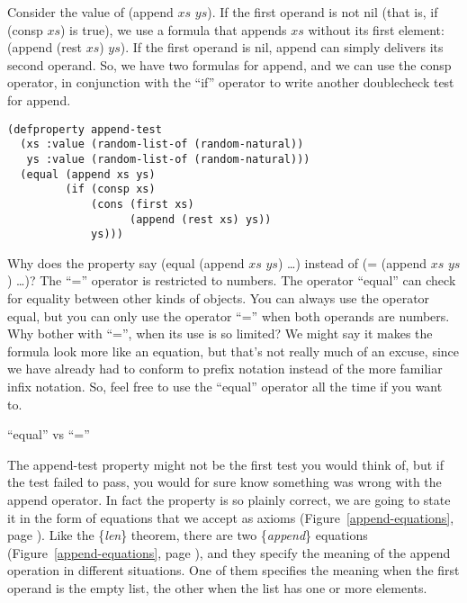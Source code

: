 Consider the value of (append $xs$ $ys$).
If the first operand is not nil (that is, if (consp $xs$) is true),
we use a formula that appends $xs$ without its first element: (append (rest $xs$) $ys$).
If the first operand is nil, append can simply delivers its second operand.
So, we have two formulas for append, and we can use the consp operator,
in conjunction with the ``if'' operator
to write another doublecheck test for append.

\begin{samepage}
\begin{Verbatim}
(defproperty append-test
  (xs :value (random-list-of (random-natural))
   ys :value (random-list-of (random-natural)))
  (equal (append xs ys)
         (if (consp xs)
             (cons (first xs)
                   (append (rest xs) ys))
             ys)))
\end{Verbatim}
\end{samepage}

\begin{aside}
Why does the property say (equal (append $xs$ $ys$) \dots)
instead of (= (append $xs$ $ys$) \dots)?
The ``='' operator
is restricted to numbers. The operator ``equal'' can check
for equality between other kinds of objects.
You can always use the operator equal,
but you can only use the operator ``='' when both operands are numbers.
Why bother with ``='', when its use is so limited?
We might say it makes the formula look more like an equation,
but that's not really much of an excuse,
since we have already had to conform to prefix notation
instead of the more familiar infix notation.
So, feel free to use the ``equal'' operator all the time if you want to.
\caption{``equal'' vs ``=''}
\label{equal}
\end{aside}

The append-test property might not be the first test you would think of,
but if the test failed to pass,
you would for sure know something was wrong with the append operator.
In fact the property is so plainly correct,
we are going to state it in the form of equations that we accept as axioms
(Figure~\ref{append-equations}, page \pageref{append-equations}).
Like the \{\emph{len}\} theorem, there are two \{\emph{append}\} equations
(Figure~\ref{append-equations}, page \pageref{append-equations}),
and they specify the meaning of the append operation in different situations.
One of them specifies the meaning when the first operand is the empty list,
the other when the list has one or more elements.

